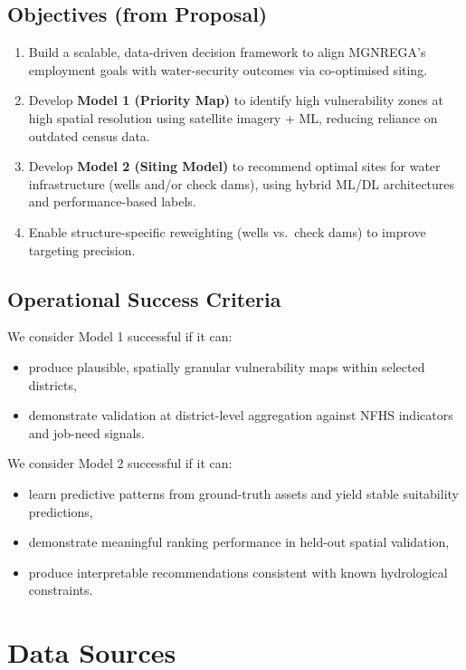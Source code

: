 \documentclass[12pt,a4paper]{report}
\begin{document}
\section{Objectives (from Proposal)}
\begin{enumerate}[label=\textbf{O\arabic*.}]
  \item Build a scalable, data-driven decision framework to align MGNREGA’s employment goals with water-security outcomes via co-optimised siting.
  \item Develop \textbf{Model 1 (Priority Map)} to identify high vulnerability zones at high spatial resolution using satellite imagery + ML, reducing reliance on outdated census data.
  \item Develop \textbf{Model 2 (Siting Model)} to recommend optimal sites for water infrastructure (wells and/or check dams), using hybrid ML/DL architectures and performance-based labels.
  \item Enable structure-specific reweighting (wells vs.\ check dams) to improve targeting precision.
\end{enumerate}

\section{Operational Success Criteria}
We consider Model 1 successful if it can:
\begin{itemize}
  \item produce plausible, spatially granular vulnerability maps within selected districts,
  \item demonstrate validation at district-level aggregation against NFHS indicators and job-need signals.
\end{itemize}

We consider Model 2 successful if it can:
\begin{itemize}
  \item learn predictive patterns from ground-truth assets and yield stable suitability predictions,
  \item demonstrate meaningful ranking performance in held-out spatial validation,
  \item produce interpretable recommendations consistent with known hydrological constraints.
\end{itemize}

\chapter{Data Sources}
\end{document}
